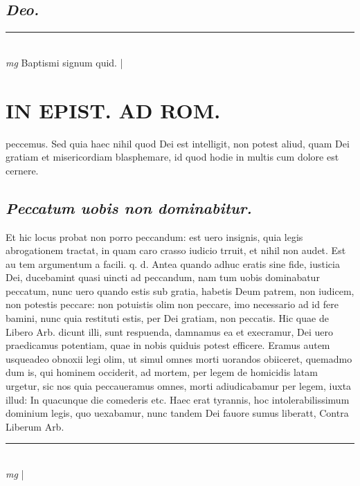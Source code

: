 \documentclass{article}
\begin{document}
\begin{pages}
\subsection*{\textit{Deo. }}
\vspace{0.5cm}\noindent
\vspace{0.2cm}\rule{1cm}{0.2pt}\\ 
\hspace{0.2cm}\textit{mg}
\footnotesize Baptismi signum quid.  
\normalsize| 
\section*{IN EPIST. AD ROM.  }
\marginpar{[ p.63 ]}\pstart peccemus. Sed quia haec nihil quod Dei est intelligit, non potest aliud, quam Dei gratiam et misericordiam blasphemare, id quod hodie in multis cum dolore est cernere.   \pend
{}
{}
\subsection*{\textit{Peccatum uobis non dominabitur. }}\pstart Et hic locus probat non porro peccandum: est uero insignis, quia legis abrogationem tractat, in quam caro crasso iudicio trruit, et nihil non audet. Est au tem argumentum a facili. q. d. Antea quando adhuc eratis sine fide, iusticia Dei, ducebamint quasi uincti ad peccandum, nam tum uobis dominabatur peccatum, nunc uero quando estis sub gratia, habetis Deum patrem, non iudicem, non potestis peccare: non potuistis olim non peccare, imo necessario ad id fere bamini, nunc quia restituti estis, per Dei gratiam, non peccatis. Hic quae de Libero Arb. dicunt illi, sunt respuenda, damnamus ea et execramur, Dei uero praedicamus potentiam, quae in nobis quiduis potest efficere. Eramus autem usqueadeo obnoxii legi olim, ut simul omnes morti uorandos obiiceret, quemadmo dum is, qui hominem occiderit, ad mortem, per legem de homicidis latam urgetur, sic nos quia peccaueramus omnes, morti adiudicabamur per legem, iuxta illud: In quacunque die comederis etc. Haec erat tyrannis, hoc intolerabilissimum dominium legis, quo uexabamur, nunc tandem Dei fauore sumus liberatt, Contra Liberum Arb.   \pend
\vspace{0.5cm}\noindent
\vspace{0.2cm}\rule{1cm}{0.2pt}\\ 
\hspace{0.2cm}\textit{mg}
\footnotesize 
\normalsize| 

\end{pages}
\end{document}

